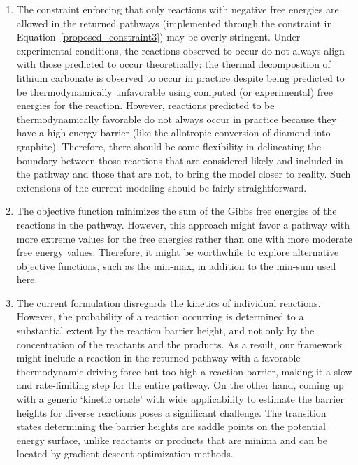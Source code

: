 \begin{enumerate}
    \item The constraint enforcing that only reactions with negative free energies are allowed in the returned pathways (implemented through the constraint in Equation~\eqref{proposed_constraint3}) may be overly stringent.
    Under experimental conditions, the reactions observed to occur do not always align with those predicted to occur theoretically: the thermal decomposition of lithium carbonate is observed to occur in practice despite being predicted to be thermodynamically unfavorable using computed (or experimental) free energies for the reaction.
    However, reactions predicted to be thermodynamically favorable do not always occur in practice because they have a high energy barrier (like the allotropic conversion of diamond into graphite).
    Therefore, there should be some flexibility in delineating the boundary between those reactions that are considered likely and included in the pathway and those that are not, to bring the model closer to reality. 
    Such extensions of the current modeling should be fairly straightforward.
    \item The objective function minimizes the sum of the Gibbs free energies of the reactions in the pathway.
    However, this approach might favor a pathway with more extreme values for the free energies rather than one with more moderate free energy values.
    Therefore, it might be worthwhile to explore alternative objective functions, such as the min-max, in addition to the min-sum used here.
    \item The current formulation disregards the kinetics of individual reactions.
    However, the probability of a reaction occurring is determined to a substantial extent by the reaction barrier height, and not only by the concentration of the reactants and the products.
    As a result, our framework might include a reaction in the returned pathway with a favorable thermodynamic driving force but too high a reaction barrier, making it a slow and rate-limiting step for the entire pathway.
    On the other hand, coming up with a generic `kinetic oracle' with wide applicability to estimate the barrier heights for diverse reactions poses a significant challenge.
    The transition states determining the barrier heights are saddle points on the potential energy surface, unlike reactants or products that are minima and can be located by gradient descent optimization methods. 
\end{enumerate}

